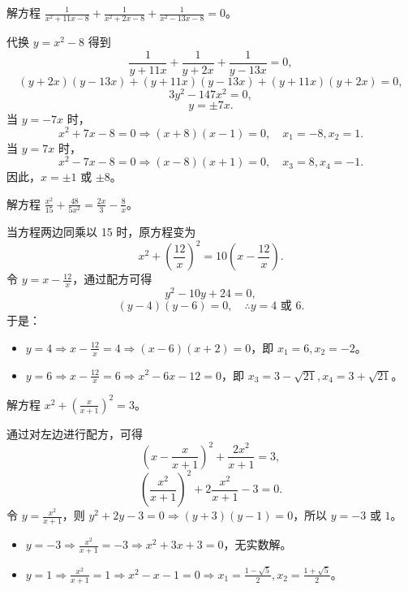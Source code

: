 \begin{questions}
\begin{solution}
\end{solution}

\question 解方程 $\frac{1}{x^2 + 11x - 8} + \frac{1}{x^2 + 2x - 8} + \frac{1}{x^2 - 13x - 8} = 0$。

\begin{solution}
代换 $y = x^2 - 8$ 得到
\[
\frac{1}{y + 11x} + \frac{1}{y + 2x} + \frac{1}{y - 13x} = 0,
\]
\[
(y + 2x)(y - 13x) + (y + 11x)(y - 13x) + (y + 11x)(y + 2x) = 0,
\]
\[
3y^2 - 147x^2 = 0,
\]
\[
y = \pm 7x.
\]
当 $y = -7x$ 时，
\[
x^2 + 7x - 8 = 0 \Rightarrow (x + 8)(x - 1) = 0, \quad x_1 = -8, x_2 = 1.
\]
当 $y = 7x$ 时，
\[
x^2 - 7x - 8 = 0 \Rightarrow (x - 8)(x + 1) = 0, \quad x_3 = 8, x_4 = -1.
\]
因此，$x = \pm 1$ 或 $\pm 8$。
\end{solution}

\question 解方程 $\frac{x^2}{15} + \frac{48}{5x^2} = \frac{2x}{3} - \frac{8}{x}$。

\begin{solution}
当方程两边同乘以 15 时，原方程变为
\[
x^2 + \left( \frac{12}{x} \right)^2 = 10 \left( x - \frac{12}{x} \right).
\]
令 $y = x - \frac{12}{x}$，通过配方可得
\[
y^2 - 10y + 24 = 0,
\]
\[
(y - 4)(y - 6) = 0, \quad \therefore y = 4 \text{ 或 } 6.
\]
于是：
\begin{itemize}
    \item $y = 4 \Rightarrow x - \frac{12}{x} = 4 \Rightarrow (x - 6)(x + 2) = 0$，即 $x_1 = 6, x_2 = -2$。
    \item $y = 6 \Rightarrow x - \frac{12}{x} = 6 \Rightarrow x^2 - 6x - 12 = 0$，即 $x_3 = 3 - \sqrt{21}, x_4 = 3 + \sqrt{21}$。
\end{itemize}
\end{solution}

\question 解方程 $x^2 + \left( \frac{x}{x + 1} \right)^2 = 3$。

\begin{solution}
通过对左边进行配方，可得
\[
\left( x - \frac{x}{x + 1} \right)^2 + \frac{2x^2}{x + 1} = 3,
\]
\[
\left( \frac{x^2}{x + 1} \right)^2 + 2 \frac{x^2}{x + 1} - 3 = 0.
\]
令 $y = \frac{x^2}{x + 1}$，则 $y^2 + 2y - 3 = 0 \Rightarrow (y + 3)(y - 1) = 0$，所以 $y = -3$ 或 $1$。
\begin{itemize}
\item $y = -3 \Rightarrow \frac{x^2}{x + 1} = -3 \Rightarrow x^2 + 3x + 3 = 0$，无实数解。
\item $y = 1 \Rightarrow \frac{x^2}{x + 1} = 1 \Rightarrow x^2 - x - 1 = 0 \Rightarrow x_1 = \frac{1 - \sqrt{5}}{2}, x_2 = \frac{1 + \sqrt{5}}{2}$。
\end{itemize}
\end{solution}


\end{questions}
